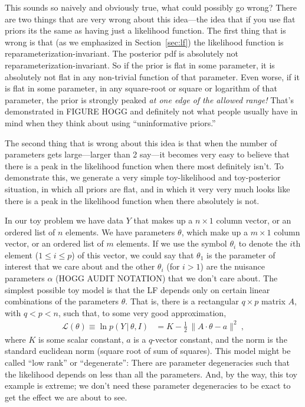 \documentclass{article}
\newcommand{\sectionname}{Section}
\newcommand{\secref}[1]{\sectionname~\ref{#1}}
\newcommand{\given}{\,|\,}
\newcommand{\norm}[1]{\lVert{#1}\rVert}
\begin{document}
This sounds so naively and obviously true, what could possibly go wrong?
There are two things that are very wrong about this idea---the idea that if you use flat priors its the same as having just a likelihood function.
The first thing that is wrong is that (as we emphasized in \secref{sec:lf}) the likelihood function is reparameterization-invariant.
The posterior pdf is absolutely not reparameterization-invariant.
So if the prior is flat in some parameter, it is absolutely not flat in any non-trivial function of that parameter.
Even worse, if it is flat in some parameter, in any square-root or square or logarithm of that parameter, the prior is strongly peaked \emph{at one edge of the allowed range!}
That's demonstrated in FIGURE HOGG and definitely not what people usually have in mind when they think about using ``uninformative priors.''

The second thing that is wrong about this idea is that when the number of parameters gets large---larger than 2 say---it becomes very easy to believe that there is a peak in the likelihood function when there most definitely isn't.
To demonstrate this, we generate a very simple toy-likelihood and toy-posterior situation, in which all priors are flat, and in which it very very much looks like there is a peak in the likelihood function when there absolutely is not.

In our toy problem we have data $Y$ that makes up a $n\times 1$ column vector, or an ordered list of $n$ elements.
We have parameters $\theta$, which make up a $m\times 1$ column vector, or an ordered list of $m$ elements.
If we use the symbol $\theta_i$ to denote the $i$th element ($1\leq i\leq p$) of this vector, we could say that $\theta_1$ is the parameter of interest that we care about and the other $\theta_i$ (for $i>1$) are the nuisance parameters $\alpha$ (HOGG AUDIT NOTATION) that we don't care about.
The simplest possible toy model is that the LF depends only on certain linear combinations of the parameters $\theta$.
That is, there is a rectangular $q\times p$ matrix $A$, with $q<p<n$, such that, to some very good approximation,
\begin{align}
    \mathscr{L}(\theta) \equiv \ln p(Y\given\theta,I) &= K - \frac{1}{2}\,\norm{A\cdot\theta - a}^2 ~,\label{eq:toyLF}
\end{align}
where $K$ is some scalar constant, $a$ is a $q$-vector constant, and the norm is the standard euclidean norm (square root of sum of squares).
This model might be called ``low rank'' or ``degenerate'':
There are parameter degeneracies such that the likelihood depends on less than all the parameters.
And, by the way, this toy example is extreme; we don't need these parameter degeneracies to be exact to get the effect we are about to see.
\end{document}
